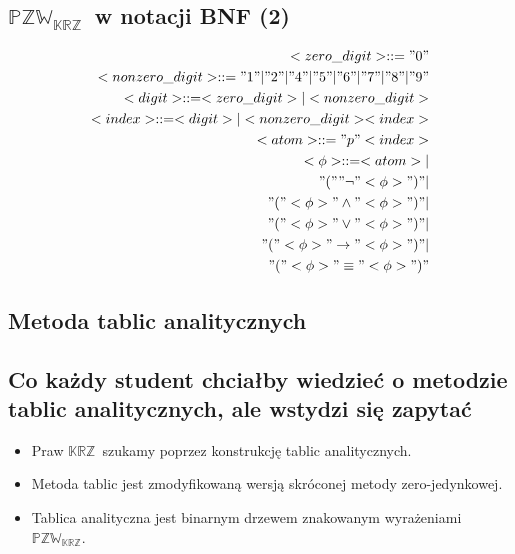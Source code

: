 \documentclass[12pt]{article}
\newcommand {\KRZ} {\ensuremath{\mathbb{KRZ}}}
\newcommand {\PZWKRZ} {\ensuremath{\mathbb{PZW_{KRZ}}}}
\begin{document}
\subsection{\PZWKRZ\ w notacji BNF (2)}
%
\begin{eqnarray}
<zero\_digit> :: = "0" \\ %
<nonzero\_digit> :: = "1" | "2" | "4" | "5" | "6" | "7" | "8" | "9" \\ %
<digit> :: = <zero\_digit> | <nonzero\_digit> \\ %
<index> :: = <digit> | <nonzero\_digit><index> \\ %
<atom> ::= "p"<index> \\  %
<\phi> ::= <atom> | \nonumber  \\
"(" "\neg"  <\phi> ")" | \nonumber \\
"(" <\phi> "\land" <\phi> ")" | \nonumber \\
"(" <\phi> "\lor" <\phi> ")" | \nonumber  \\
"(" <\phi> "\to" <\phi> ")" | \nonumber  \\
"(" <\phi> "\equiv" <\phi> ")"
\end{eqnarray}
%


\subsection{Metoda tablic analitycznych}

\subsection{Co każdy student chciałby wiedzieć o metodzie tablic analitycznych, ale wstydzi się zapytać}
%
\begin{itemize}
\item Praw \KRZ ~szukamy poprzez konstrukcję tablic analitycznych.\\
%
\item Metoda tablic jest zmodyfikowaną wersją skróconej metody zero-jedynkowej.\\
%
\item Tablica analityczna  jest binarnym drzewem znakowanym wyrażeniami \PZWKRZ.
\end{itemize}
%
\end{document}
